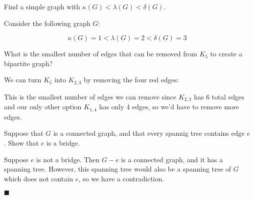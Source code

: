 \documentclass[12pt]{article}
\renewcommand{\qed}{\hfill$\blacksquare$}
\renewenvironment{proof}{\vspace{1em}\begin{addmargin}[2em]{0em}\begin{newproof}}{\end{newproof}\end{addmargin}\qed}
\newenvironment{exercise}[2][Exercise]{\begin{trivlist}
\item[\hskip \labelsep {\bfseries #1} \hskip \labelsep {\bfseries #2.}]}{\end{trivlist}}
\begin{document}
\begin{exercise}{5.7.6 (2pt)}
	Find a simple graph with $\kappa(G) < \lambda(G) < \delta(G)$.
\end{exercise}	
Consider the following graph $G$:
\begin{center}
\end{center}
\[
	\kappa(G) = 1 < \lambda(G) = 2 < \delta(G) = 3
\]
\begin{exercise}{5.4.2 (2pt)}
	What is the smallest number of edges that can be removed from $K_5$ to create a bipartite graph?
\end{exercise}	
We can turn $K_5$ into $K_{2,3}$ by removing the four red edges:
\begin{center}
\end{center}
This is the smallest number of edges we can remove since $K_{2,3}$ has 6 total edges and our only other option $K_{1,4}$ has only 4 edges, so we'd have to remove more edges.
\begin{exercise}{5.5.1 (2pt)}
	Suppose that $G$ is a connected graph, and that every spannig tree contains edge $e$. Show that $e$ is a bridge.
\end{exercise}	
\begin{proof}
	Suppose $e$ is not a bridge. Then $G - {e}$ is a connected graph, and it has a spanning tree. However, this spanning tree would also be a spanning tree of $G$ which does not contain $e$, so we have a contradiction.
\end{proof}
\end{document}
